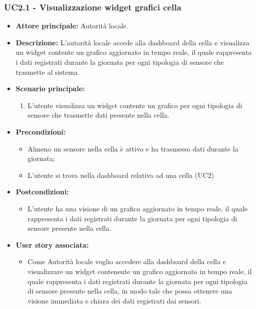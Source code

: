 \subsubsection{UC2.1 - Visualizzazione widget grafici cella}
\begin{itemize}
    \item \textbf{Attore principale:} Autorità locale.
    \item \textbf{Descrizione:} L'autorità locale accede alla dashboard della cella e visualizza un widget contente un grafico aggiornato in tempo reale, il quale rappresenta i dati registrati durante la giornata per ogni tipologia di sensore che trasmette al sistema.
    \item \textbf{Scenario principale:}
          \begin{enumerate}
              \item L'utente visualizza un widget contente un grafico per ogni tipologia di sensore che trasmette dati presente nella cella.
          \end{enumerate}
    \item \textbf{Precondizioni:}
          \begin{itemize}
              \item  Almeno un sensore nella cella è attivo e ha trasmesso dati durante la giornata;
              \item L'utente si trova nella dashboard relativa ad una cella (UC2)
          \end{itemize}
    \item \textbf{Postcondizioni:}
          \begin{itemize}
              \item      L'utente ha una visione di un grafico aggiornato in tempo reale, il quale rappresenta i dati registrati durante la giornata per ogni tipologia di sensore presente nella cella.
          \end{itemize}
    \item \textbf{User story associata:}
          \begin{itemize}
              \item Come Autorità locale voglio accedere alla dashboard della cella e visualizzare un widget contenente un grafico aggiornato in tempo reale, il quale rappresenta i dati registrati durante la giornata per ogni tipologia di sensore presente nella cella,
                    in modo tale che possa ottenere una visione immediata e chiara dei dati registrati dai sensori.
          \end{itemize}
\end{itemize}